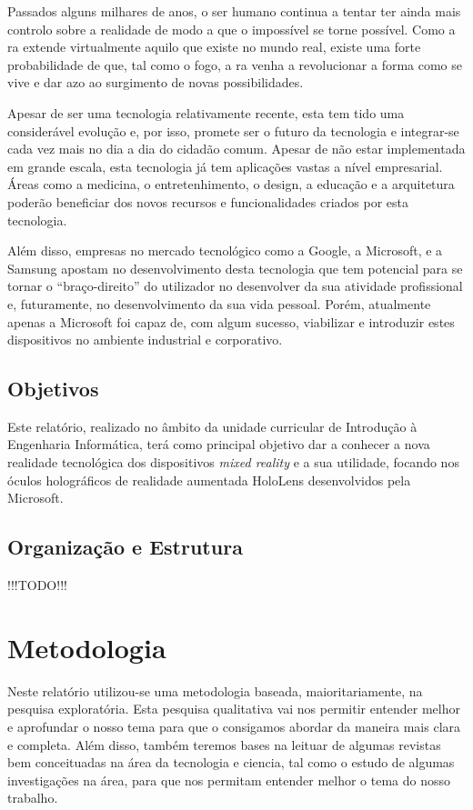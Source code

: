 \documentclass{report}
\begin{document}
Passados alguns milhares de anos, o ser humano continua a tentar ter ainda mais controlo sobre a realidade de modo a que o impossível se torne possível. Como a \ac{ra} extende virtualmente aquilo que existe no mundo real, existe uma forte probabilidade de que, tal como o fogo, a \ac{ra} venha a revolucionar a forma como se vive e dar azo ao surgimento de novas possibilidades.

Apesar de ser uma tecnologia relativamente recente, esta tem tido uma considerável evolução e, por isso, promete ser o futuro da tecnologia e integrar-se cada vez mais no dia a dia do cidadão comum. Apesar de não estar implementada em grande escala, esta tecnologia já tem aplicações vastas a nível empresarial. Áreas como a medicina, o entretenhimento, o design, a educação e a arquitetura poderão beneficiar dos novos recursos e funcionalidades criados por esta tecnologia.

Além disso, empresas no mercado tecnológico como a Google, a Microsoft, e a Samsung apostam no desenvolvimento desta tecnologia que tem potencial para se tornar o “braço-direito” do utilizador no desenvolver da sua atividade profissional e, futuramente, no desenvolvimento da sua vida pessoal. Porém, atualmente apenas a Microsoft foi capaz de, com algum sucesso, viabilizar e introduzir estes dispositivos no ambiente industrial e corporativo.

\section{Objetivos}
Este relatório, realizado no âmbito da unidade curricular de Introdução à Engenharia Informática, terá como principal objetivo dar a conhecer a nova realidade tecnológica dos dispositivos \textit{mixed reality} e a sua utilidade, focando nos óculos holográficos de realidade aumentada HoloLens desenvolvidos pela Microsoft. 

\section{Organização e Estrutura}
!!!TODO!!!

\chapter{Metodologia}
\label{chap.metodologia}
Neste relatório utilizou-se uma metodologia baseada, maioritariamente, na pesquisa exploratória. Esta pesquisa qualitativa vai nos permitir entender melhor e aprofundar o nosso tema para que o consigamos abordar da maneira mais clara e completa. Além disso, também teremos bases na leituar de algumas revistas bem conceituadas na área da tecnologia e ciencia, tal como o estudo de algumas investigações na área, para que nos permitam entender melhor o tema do nosso trabalho.
\end{document}
